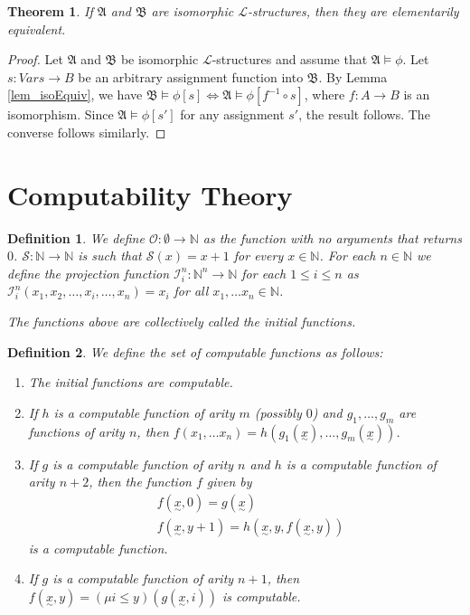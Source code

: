 \documentclass[leqno]{article}
\newtheorem{theorem}{Theorem}[section]
\newtheorem{definition}{Definition}[section]
\newcommand{\N}{\mathbb{N}}
\newcommand{\lang}{\mathcal{L}}
\newcommand{\struct}[1]{\mathfrak{#1}}
\newcommand{\utilde}[1]{\underset{\sim}{#1}}
\newcommand{\prt}[1]{\mathcal{#1}}
\begin{document}
\begin{theorem}
    If $\struct{A}$ and $\struct{B}$ are isomorphic $\lang$-structures, then they are elementarily equivalent.
\end{theorem}

\begin{proof}
   Let $\struct{A}$ and $\struct{B}$ be isomorphic $\lang$-structures and assume that $\struct{A} \models \phi$. Let $s: Vars \to B$ be an arbitrary assignment function into $\struct{B}$. By Lemma \ref{lem_isoEquiv}, we have $\struct{B} \models \phi[s] \iff \struct{A} \models \phi[f^{-1} \circ s]$, where $f:A \to B$ is an isomorphism. Since $\struct{A} \models \phi[s']$ for any assignment $s'$, the result follows. The converse follows similarly.
\end{proof}

\section{Computability Theory}

\begin{definition}
  We define $\prt{O} : \emptyset \to \N$ as the function with no arguments that returns $0$. $\prt{S} : \N \to \N$ is such that $\prt{S}(x) = x + 1$ for every $x \in \N$. For each $n \in \N$ we define the projection function $\prt{I}^n_i : \N^n \to \N$ for each $1 \leq i \leq n$ as $\prt{I}^n_i(x_1, x_2, \dots, x_i, \dots, x_n) = x_i$ for all $x_1, \dots x_n \in \N$.
  
  The functions above are collectively called the initial functions.
\end{definition}

\begin{definition}
  We define the set of computable functions as follows:
  
  \begin{enumerate}
      \item The initial functions are computable.
      
      \item If $h$ is a computable function of arity $m$ (possibly $0$) and $g_1, \dots, g_m$ are functions of arity $n$, then $f(x_1, \dots x_n) = h(g_1(\utilde{x}), \dots, g_m(\utilde{x}))$.
      
     \item If $g$ is a computable function of arity $n$ and $h$ is a computable function of arity $n+2$, then the function $f$ given by 
     \begin{align*}
         &f(\utilde{x}, 0) = g(\utilde{x}) \\
         &f(\utilde{x}, y+1) = h(\utilde{x}, y, f(\utilde{x}, y))
     \end{align*} is a computable function.
     
     \item If $g$ is a computable function of arity $n+1$, then $f(\utilde{x}, y) = (\mu i \leq y) (g(\utilde{x}, i))$ is computable.
  \end{enumerate}
\end{definition}
\end{document}
